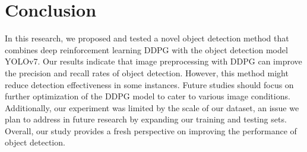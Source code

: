 \documentclass{PHlab-thesis}
\begin{document}
\chapter{Conclusion}
In this research, we proposed and tested a novel object detection method that combines deep reinforcement learning DDPG with the object detection model YOLOv7. Our results indicate that image preprocessing with DDPG can improve the precision and recall rates of object detection. However, this method might reduce detection effectiveness in some instances. Future studies should focus on further optimization of the DDPG model to cater to various image conditions. Additionally, our experiment was limited by the scale of our dataset, an issue we plan to address in future research by expanding our training and testing sets. Overall, our study provides a fresh perspective on improving the performance of object detection.

\newpage
{}
\printbibliography
\end{document}
